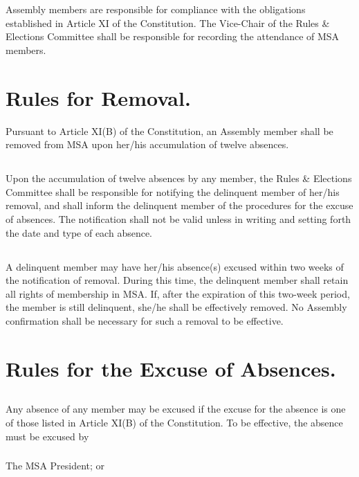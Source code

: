 \documentclass{rules}
\begin{document}
\section{}
Assembly members are responsible for compliance with the obligations established in Article XI of the Constitution.  The Vice-Chair of the Rules \& Elections Committee shall be responsible for recording the attendance of MSA members.

\section{Rules for Removal.}
Pursuant to Article XI(B) of the Constitution, an Assembly member shall be removed from MSA upon her/his accumulation of twelve absences.
\subsection{}
Upon the accumulation of twelve absences by any member, the Rules \& Elections Committee shall be responsible for notifying the delinquent member of her/his removal, and shall inform the delinquent member of the procedures for the excuse of absences.  The notification shall not be valid unless in writing and setting forth the date and type of each absence.
\subsection{}
A delinquent member may have her/his absence(s) excused within two weeks of the notification of removal.  During this time, the delinquent member shall retain all rights of membership in MSA.  If, after the expiration of this two-week period, the member is still delinquent, she/he shall be effectively removed.  No Assembly confirmation shall be necessary for such a removal to be effective.

\section{Rules for the Excuse of Absences.}
\subsection{}
Any absence of any member may be excused if the excuse for the absence is one of those listed in Article XI(B) of the Constitution.  To be effective, the absence must be excused by
\subsubsection{}
The MSA President; or
\end{document}
